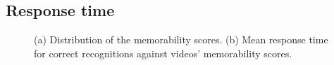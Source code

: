 \documentclass[sigconf]{acmart}
\begin{document}
\subsection{Response time}
\begin{figure}[!htbp]
	\centering
	\quad
	\quad
	\caption{\label{fig:response_time_vs_memorability}(a) Distribution of the memorability scores. (b) Mean response time for correct recognitions against videos' memorability scores.}
\end{figure}
\end{document}
